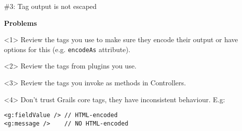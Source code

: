 \begin{frame}

  \vspace{.5cm}

  \begin{center}
    \Huge\color{red} \#3: Tag output is not escaped
  \end{center}

  \vspace{1cm}

    \Large
    \textbf{Problems} \\[1em]

    \begin{onlyenv}<1>
      Review the tags you use to make sure they encode their output
      or have options for this (e.g. \verb|encodeAs| attribute).
    \end{onlyenv}

    \begin{onlyenv}<2>
      Review the tags from plugins you use.
    \end{onlyenv}

    \begin{onlyenv}<3>
      Review the tags you invoke as methods in Controllers.
    \end{onlyenv}

    \begin{onlyenv}<4>
      Don't trust Grails core tags, they have inconsistent behaviour. E.g:
      \begin{center}
        \begin{minipage}{.9\textwidth}
          \begin{verbatim}
<g:fieldValue /> // HTML-encoded
<g:message />    // NO HTML-encoded
          \end{verbatim}
        \end{minipage}
      \end{center}
    \end{onlyenv}

    \vfill

\end{frame}


